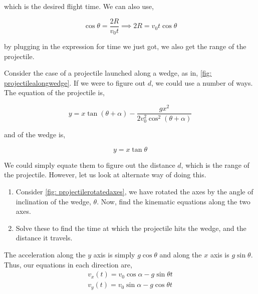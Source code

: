 \begin{exc}
\begin{solution}
        which is the desired flight time. We can also use,

        \begin{equation*}
            \cos\theta = \frac{2R}{v_0t} \implies 2R = v_0t\cos\theta
        \end{equation*}

        by plugging in the expression for time we just got, we also get the range of the projectile. 
    \end{solution}
    
    \begin{exercise}[points = 3]
        Consider the case of a projectile launched along a wedge, as in,
        \cref{fig: projectilealongwedge}. If we were to figure out \(d\), we could 
        use a number of ways. The equation of the projectile is,

        \begin{equation*}
            y = x\tan(\theta+\alpha) - \frac{gx^2}{2v_0^2\cos^2(\theta+\alpha)}
        \end{equation*}

        and of the wedge is,

        \begin{equation*}
            y = x\tan\theta 
        \end{equation*}

        We could simply equate them to figure out the distance \(d\), which is the range of the projectile.
        However, let us look at alternate way of doing this.

        \begin{enumerate}
            \item Consider \cref{fig: projectilerotatedaxes}, we have rotated the axes by the angle of inclination of the wedge, \(\theta\). Now, find the kinematic equations along the two axes.
            \item Solve these to find the time at which the projectile hits the wedge, and the distance it travels. 
        \end{enumerate}

    \end{exercise}

    \begin{solution}
        The acceleration along the \(y\) axis is simply \(g\cos\theta\) and along the \(x\) axis 
        is \(g\sin\theta\). Thus, our equations in each direction are,
            \begin{align*}
                v_x(t) = v_0\cos\alpha - g\sin\theta t\\
                v_y(t) = v_0\sin\alpha - g\cos\theta t 
            \end{align*}


\end{solution}
\end{exc}
